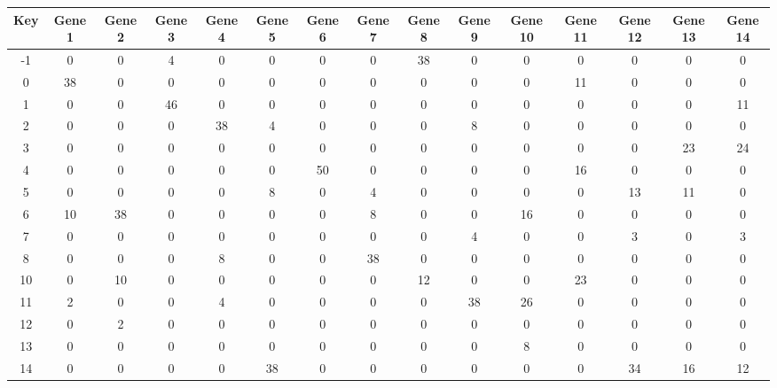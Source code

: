\begin{tabular}{|c|c|c|c|c|c|c|c|c|c|c|c|c|c|c|}
\hline
Key & Gene 1 & Gene 2 & Gene 3 & Gene 4 & Gene 5 & Gene 6 & Gene 7 & Gene 8 & Gene 9 & Gene 10 & Gene 11 & Gene 12 & Gene 13 & Gene 14 \\
\hline
-1 & 0 & 0 & 4 & 0 & 0 & 0 & 0 & 38 & 0 & 0 & 0 & 0 & 0 & 0 \\
0 & 38 & 0 & 0 & 0 & 0 & 0 & 0 & 0 & 0 & 0 & 11 & 0 & 0 & 0 \\
1 & 0 & 0 & 46 & 0 & 0 & 0 & 0 & 0 & 0 & 0 & 0 & 0 & 0 & 11 \\
2 & 0 & 0 & 0 & 38 & 4 & 0 & 0 & 0 & 8 & 0 & 0 & 0 & 0 & 0 \\
3 & 0 & 0 & 0 & 0 & 0 & 0 & 0 & 0 & 0 & 0 & 0 & 0 & 23 & 24 \\
4 & 0 & 0 & 0 & 0 & 0 & 50 & 0 & 0 & 0 & 0 & 16 & 0 & 0 & 0 \\
5 & 0 & 0 & 0 & 0 & 8 & 0 & 4 & 0 & 0 & 0 & 0 & 13 & 11 & 0 \\
6 & 10 & 38 & 0 & 0 & 0 & 0 & 8 & 0 & 0 & 16 & 0 & 0 & 0 & 0 \\
7 & 0 & 0 & 0 & 0 & 0 & 0 & 0 & 0 & 4 & 0 & 0 & 3 & 0 & 3 \\
8 & 0 & 0 & 0 & 8 & 0 & 0 & 38 & 0 & 0 & 0 & 0 & 0 & 0 & 0 \\
10 & 0 & 10 & 0 & 0 & 0 & 0 & 0 & 12 & 0 & 0 & 23 & 0 & 0 & 0 \\
11 & 2 & 0 & 0 & 4 & 0 & 0 & 0 & 0 & 38 & 26 & 0 & 0 & 0 & 0 \\
12 & 0 & 2 & 0 & 0 & 0 & 0 & 0 & 0 & 0 & 0 & 0 & 0 & 0 & 0 \\
13 & 0 & 0 & 0 & 0 & 0 & 0 & 0 & 0 & 0 & 8 & 0 & 0 & 0 & 0 \\
14 & 0 & 0 & 0 & 0 & 38 & 0 & 0 & 0 & 0 & 0 & 0 & 34 & 16 & 12 \\
\hline
\end{tabular}